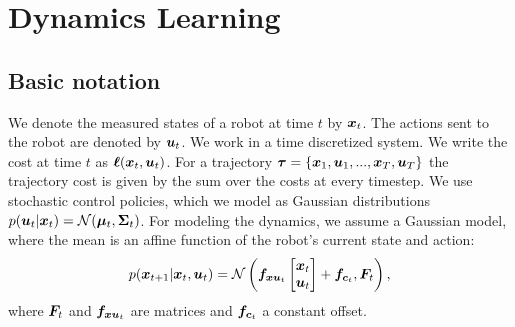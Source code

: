 %
\section{Dynamics Learning}
\label{sec:dyn_learning}
%
%
\subsection{Basic notation}
%
We denote the measured states of a robot at time $t$ by $\bm{x}_{t}$. The actions sent to the robot are denoted by $\bm{u}_{t}$. We work in a time discretized system. We write the cost at time $t$ as $\bm{\ell}(\bm{x}_{t}, \bm{u}_{t})$. For a trajectory $\bm{\tau} = \{\bm{x}_1, \bm{u}_1, ..., \bm{x}_T, \bm{u}_T\}$ the trajectory cost is given by the sum over the costs at every timestep. We use stochastic control policies, which we model as Gaussian distributions $p(\bm{u}_{t}|\bm{x}_{t}) = \mathcal{N}(\bm{\mu}_t, \bm{\Sigma}_t)$. For modeling the dynamics, we assume a Gaussian model, where the mean is an affine function of the robot's current state and action:
%
\begin{align}
\label{eq:def_dynamics}
p(\bm{x}_{t + 1} | \bm{x}_{t}, \bm{u}_{t}) = \mathcal{N}\left(\bm{f}_{\bm{xu}_t} \begin{bmatrix} \bm{x}_{t} \\ \bm{u}_{t} \end{bmatrix} + \bm{f}_{\bm{c}_t}, \bm{F}_t \right),
\end{align}
%
where $\bm{F}_t$ and $\bm{f}_{\bm{xu}_t}$ are matrices and $\bm{f}_{\bm{c}_t}$ a constant offset.
%
